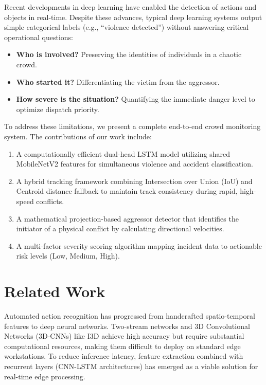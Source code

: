 \documentclass[conference]{IEEEtran}
\begin{document}
Recent developments in deep learning have enabled the detection of actions and objects in real-time. Despite these advances, typical deep learning systems output simple categorical labels (e.g., ``violence detected'') without answering critical operational questions:
\begin{itemize}
    \item \textbf{Who is involved?} Preserving the identities of individuals in a chaotic crowd.
    \item \textbf{Who started it?} Differentiating the victim from the aggressor.
    \item \textbf{How severe is the situation?} Quantifying the immediate danger level to optimize dispatch priority.
\end{itemize}

To address these limitations, we present a complete end-to-end crowd monitoring system. The contributions of our work include:
\begin{enumerate}
    \item A computationally efficient dual-head LSTM model utilizing shared MobileNetV2 features for simultaneous violence and accident classification.
    \item A hybrid tracking framework combining Intersection over Union (IoU) and Centroid distance fallback to maintain track consistency during rapid, high-speed conflicts.
    \item A mathematical projection-based aggressor detector that identifies the initiator of a physical conflict by calculating directional velocities.
    \item A multi-factor severity scoring algorithm mapping incident data to actionable risk levels (Low, Medium, High).
\end{enumerate}

\section{Related Work}
Automated action recognition has progressed from handcrafted spatio-temporal features to deep neural networks. Two-stream networks and 3D Convolutional Networks (3D-CNNs) like I3D achieve high accuracy but require substantial computational resources, making them difficult to deploy on standard edge workstations. To reduce inference latency, feature extraction combined with recurrent layers (CNN-LSTM architectures) has emerged as a viable solution for real-time edge processing.
\end{document}
